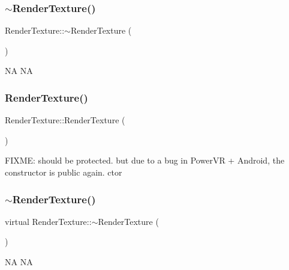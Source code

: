 \subsubsection{\texorpdfstring{$\sim$\+Render\+Texture()}{~RenderTexture()}\hspace{0.1cm}{\footnotesize\ttfamily [1/2]}}
{\footnotesize\ttfamily Render\+Texture\+::$\sim$\+Render\+Texture (\begin{DoxyParamCaption}{ }\end{DoxyParamCaption})\hspace{0.3cm}{\ttfamily [virtual]}}

NA  NA \mbox{\label{classRenderTexture_a1882e3cf661e622e5e494c1d7ec9e798}} 
\subsubsection{\texorpdfstring{Render\+Texture()}{RenderTexture()}\hspace{0.1cm}{\footnotesize\ttfamily [2/2]}}
{\footnotesize\ttfamily Render\+Texture\+::\+Render\+Texture (\begin{DoxyParamCaption}{ }\end{DoxyParamCaption})}

F\+I\+X\+ME\+: should be protected. but due to a bug in Power\+VR + Android, the constructor is public again.  ctor \mbox{\label{classRenderTexture_a428b5e7e40f5bd8b121d71eef60a881a}} 
\subsubsection{\texorpdfstring{$\sim$\+Render\+Texture()}{~RenderTexture()}\hspace{0.1cm}{\footnotesize\ttfamily [2/2]}}
{\footnotesize\ttfamily virtual Render\+Texture\+::$\sim$\+Render\+Texture (\begin{DoxyParamCaption}{ }\end{DoxyParamCaption})\hspace{0.3cm}{\ttfamily [virtual]}}

NA  NA 

